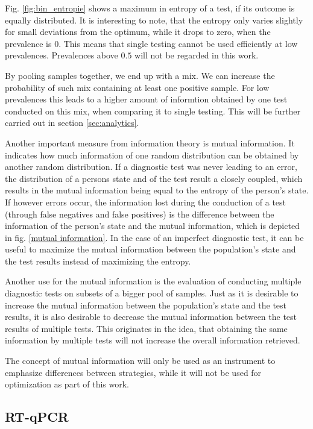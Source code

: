 \documentclass[fleqn,10pt]{wlscirep}
\begin{document}
Fig. \ref{fig:bin_entropie} shows a maximum in entropy of a test, if its outcome is equally distributed. It is interesting to note, that the entropy only varies slightly for small deviations from the optimum, while it drops to zero, when the prevalence is $0$. This means that single testing cannot be used efficiently at low prevalences. Prevalences above $0.5$ will not be regarded in this work.

By pooling samples together, we end up with a mix. We can increase the probability of such mix containing at least one positive sample. For low prevalences this leads to a higher amount of informtion obtained by one test conducted on this mix, when comparing it to single testing. This will be further carried out in section \ref{sec:analytics}.

Another important measure from information theory is mutual information. It indicates how much information of one random distribution can be obtained by another random distribution. If a diagnostic test was never leading to an error, the distribution of a persons state and of the test result a closely coupled, which results in the mutual information being equal to the entropy of the person's state. If however errors occur, the information lost during the conduction of a test (through false negatives and false positives) is the difference between the information of the person's state and the mutual information, which is depicted in fig. \ref{mutual information}. In the case of an imperfect diagnostic test, it can be useful to maximize the mutual information between the population's state and the test results instead of maximizing the entropy.


Another use for the mutual information is the evaluation of conducting multiple diagnostic tests on subsets of a bigger pool of samples. Just as it is desirable to increase the mutual information between the population's state and the test results, it is also desirable to decrease the mutual information between the test results of multiple tests. This originates in the idea, that obtaining the same information by multiple tests will not increase the overall information retrieved.

The concept of mutual information will only be used as an instrument to emphasize differences between strategies, while it will not be used for optimization as part of this work.


\subsection{RT-qPCR}
\end{document}
